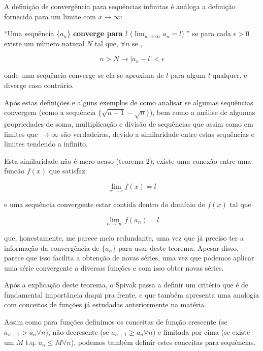 \documentclass[a4paper, 12pt]{article}
\begin{document}
A definição de convergência para sequências infinitas é análoga a definição fornecida
para um limite com ${x \to \infty}$:

``Uma sequência \{$a_n$\} \textbf{converge para $l$} ($ \lim_{n \to \infty} a_n = l $) ''  se para cada
$\epsilon > 0$ existe um número natural $N$ tal que, $\forall n$ se , 

\begin{equation}
	\nonumber n > N \to |a_n - l| < \epsilon 
\end{equation}

onde uma sequência converge se ela se aproxima de $l$ para algum $l$ qualquer, e diverge
caso contrário.

Após estas definições e alguns exemplos de como analisar se algumas sequências convergem
(como a sequência $\{\sqrt{n+1} - \sqrt{n}\}$), bem como a análise de algumas propriedades 
de soma, multiplicação e divisão de sequências
que assim como em limites que $\to \infty$ são verdadeiras, devido a similaridade entre
estas sequências e limites tendendo a infinito.

Esta similaridade não é mero acaso (teorema 2), existe uma conexão entre uma funcão $f(x)$ que
satisfaz

\begin{equation}
	\nonumber \lim_{x \to c} f(x) = l
\end{equation}

e uma sequência convergente estar contida dentro do domínio de $f(x)$ tal que
	
\begin{equation}
	\nonumber \lim_{n \to \infty} f(a_n) = l
\end{equation}

que, honestamente, me parece meio redundante, uma vez que já preciso ter a informação
da convergência de $\{a_n\}$ para usar deste teorema. Apesar disso, parece que isso facilita a 
obtenção de novas séries, uma vez que podemos aplicar uma série convergente a diversas
funções e com isso obter novas séries.

Após a explicação deste teorema, o Spivak passa a definir um critério que é de fundamental 
importância daqui pra frente, e que também apresenta uma analogia com conceitos de 
funções já estudadas anteriormente na matéria. 

Assim como para funções definimos os conceitas de função crescente (se $a_{n+1} > a_n \forall n$),
não-decresente (se $a_{n+1} \geq a_n \forall n$) e limitada por cima (se existe um $M$ t.q.
$a_n \leq M \forall n$), podemos também definir estes conceitas para sequências.
\end{document}
